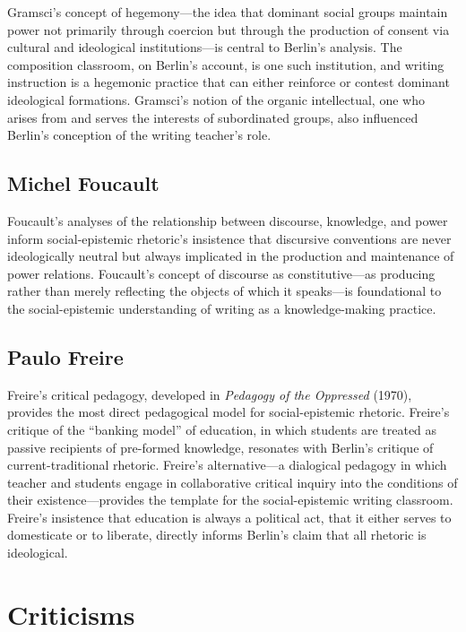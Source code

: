 \documentclass[12pt]{article}
\begin{document}
Gramsci's concept of hegemony---the idea that dominant social groups maintain power not primarily through coercion but through the production of consent via cultural and ideological institutions---is central to Berlin's analysis. The composition classroom, on Berlin's account, is one such institution, and writing instruction is a hegemonic practice that can either reinforce or contest dominant ideological formations. Gramsci's notion of the organic intellectual, one who arises from and serves the interests of subordinated groups, also influenced Berlin's conception of the writing teacher's role.

\subsection*{Michel Foucault}

Foucault's analyses of the relationship between discourse, knowledge, and power inform social-epistemic rhetoric's insistence that discursive conventions are never ideologically neutral but always implicated in the production and maintenance of power relations. Foucault's concept of discourse as constitutive---as producing rather than merely reflecting the objects of which it speaks---is foundational to the social-epistemic understanding of writing as a knowledge-making practice.

\subsection*{Paulo Freire}

Freire's critical pedagogy, developed in \textit{Pedagogy of the Oppressed} (1970), provides the most direct pedagogical model for social-epistemic rhetoric. Freire's critique of the ``banking model'' of education, in which students are treated as passive recipients of pre-formed knowledge, resonates with Berlin's critique of current-traditional rhetoric. Freire's alternative---a dialogical pedagogy in which teacher and students engage in collaborative critical inquiry into the conditions of their existence---provides the template for the social-epistemic writing classroom. Freire's insistence that education is always a political act, that it either serves to domesticate or to liberate, directly informs Berlin's claim that all rhetoric is ideological.

\section{Criticisms}
\end{document}
